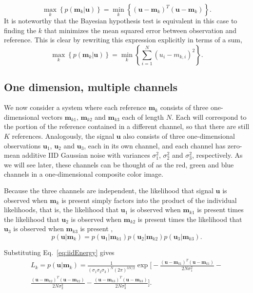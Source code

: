 \begin{equation}
\max_k   \left\{ p(\mathbf{m}_k|\mathbf{u}) \right\} = \min_k  \left\{ (\mathbf{u}-\mathbf{m}_k)^T(\mathbf{u}-\mathbf{m}_k) \right\}. 
\end{equation}
It is noteworthy that the Bayesian hypothesis test is equivalent in this case to finding the $k$ that minimizes the mean squared error between observation and reference. This is clear by rewriting this expression explicitly in terms of a sum,
\begin{equation}
\max_k   \left\{ p(\mathbf{m}_k|\mathbf{u}) \right\} =  \min_k  \left\{ \sum_{i=1}^N  (u_i-m_{k,i})^2   \right\}. 
\end{equation}

\subsection{One dimension, multiple channels}\label{sec:simpleModel}
We now consider a system where each reference $\mathbf{m}_k$ consists of three one-dimensional vectors $\mathbf{m}_{k1}$, $\mathbf{m}_{k2}$ and $\mathbf{m}_{k3}$ each of length $N$. Each will correspond to the portion of the reference contained in a different channel, so that there are still $K$ references. Analogously, the signal $\mathbf{u}$ also consists of three one-dimensional observations $\mathbf{u}_1$, $\mathbf{u}_2$ and $\mathbf{u}_3$, each in its own channel, and each channel has zero-mean additive IID Gaussian noise with variances $\sigma_1^2$, $\sigma_2^2$ and $\sigma_3^2$, respectively. As we will see later, these channels can be thought of as the red, green and blue channels in a one-dimensional composite color image. 

Because the three channels are independent, the likelihood that signal $\mathbf{u}$ is observed when $\mathbf{m}_k$ is present simply factors into the product of the individual likelihoods, that is, the likelihood that $\mathbf{u}_1$ is observed when $\mathbf{m}_{k1}$ is present times the likelihood that $\mathbf{u}_2$ is observed when $\mathbf{m}_{k2}$ is present times the likelihood that $\mathbf{u}_3$ is observed when $\mathbf{m}_{k3}$ is present \citep{bretthorst_probability_2003},
\begin{equation}
p(\mathbf{u}|\mathbf{m}_k) = p(\mathbf{u}_1|\mathbf{m}_{k1})p(\mathbf{u}_2|\mathbf{m}_{k2})p(\mathbf{u}_3|\mathbf{m}_{k3}).
\end{equation}

Substituting Eq.~\ref{eq:iidEnergy} gives
\begin{multline}
L_k=p(\mathbf{u}|\mathbf{m}_k) =\frac{1}{ (\sigma_1\sigma_2\sigma_3)^N  (2\pi)^{3N/2}  }  \exp\Bigg[ -\frac{(\mathbf{u}-\mathbf{m}_{k1})^T(\mathbf{u}-\mathbf{m}_{k1})} {2 N \sigma_1^2 }   - \\ \frac{(\mathbf{u}-\mathbf{m}_{k2})^T(\mathbf{u}-\mathbf{m}_{k2})} {2 N \sigma_2^2 } -\frac{(\mathbf{u}-\mathbf{m}_{k3})^T(\mathbf{u}-\mathbf{m}_{k3})} {2 N \sigma_3^2 }    \Bigg].
\end{multline}

